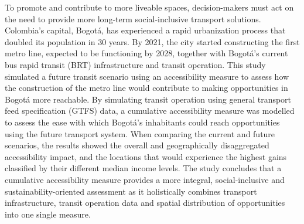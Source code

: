 
To promote and contribute to more liveable spaces, decision-makers must act on the need to provide more long-term social-inclusive transport solutions. Colombia's capital, Bogotá, has experienced a rapid urbanization process that doubled its population in 30 years. By 2021, the city started constructing the first metro line, expected to be functioning by 2028, together with Bogotá's current bus rapid transit (BRT) infrastructure and transit operation. This study simulated a future transit scenario using an accessibility measure to assess how the construction of the metro line would contribute to making opportunities in Bogotá more reachable. By simulating transit operation using general transport feed specification (GTFS) data, a cumulative accessibility measure was modelled to assess the ease with which Bogotá's inhabitants could reach opportunities using the future transport system. When comparing the current and future scenarios, the results showed the overall and geographically disaggregated accessibility impact, and the locations that would experience the highest gains classified by their different median income levels. The study concludes that a cumulative accessibility measure provides a more integral, social-inclusive and sustainability-oriented assessment as it holistically combines transport infrastructure, transit operation data and spatial distribution of opportunities into one single measure.


